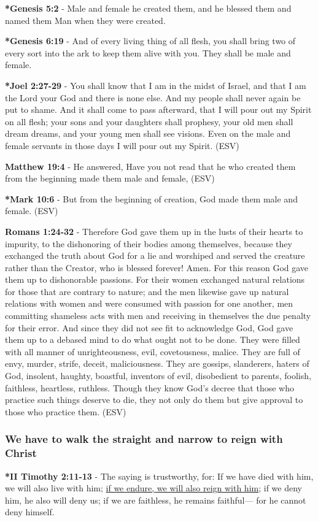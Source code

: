 \documentclass[11pt]{article}
\begin{document}
\textbf{*Genesis 5:2} - Male and female he created them, and he blessed them and named them Man when they were created.

\textbf{*Genesis 6:19} - And of every living thing of all flesh, you shall bring two of every sort into the ark to keep them alive with you. They shall be male and female.

\textbf{*Joel 2:27-29} - You shall know that I am in the midst of Israel, and that I am the Lord your God and there is none else. And my people shall never again be put to shame. And it shall come to pass afterward, that I will pour out my Spirit on all flesh; your sons and your daughters shall prophesy, your old men shall dream dreams, and your young men shall see visions. Even on the male and female servants in those days I will pour out my Spirit. (ESV)

\textbf{Matthew 19:4} - He answered, Have you not read that he who created them from the beginning made them male and female, (ESV)

\textbf{*Mark 10:6} - But from the beginning of creation, God made them male and female. (ESV)

\textbf{Romans 1:24-32} - Therefore God gave them up in the lusts of their hearts to impurity, to the dishonoring of their bodies among themselves, because they exchanged the truth about God for a lie and worshiped and served the creature rather than the Creator, who is blessed forever! Amen. For this reason God gave them up to dishonorable passions. For their women exchanged natural relations for those that are contrary to nature; and the men likewise gave up natural relations with women and were consumed with passion for one another, men committing shameless acts with men and receiving in themselves the due penalty for their error. And since they did not see fit to acknowledge God, God gave them up to a debased mind to do what ought not to be done. They were filled with all manner of unrighteousness, evil, covetousness, malice. They are full of envy, murder, strife, deceit, maliciousness. They are gossips, slanderers, haters of God, insolent, haughty, boastful, inventors of evil, disobedient to parents, foolish, faithless, heartless, ruthless. Though they know God's decree that those who practice such things deserve to die, they not only do them but give approval to those who practice them. (ESV)

\subsubsection{We have to walk the straight and narrow to reign with Christ}
\label{sec:orga8c9648}
\textbf{*II Timothy 2:11-13} - The saying is trustworthy, for: If we have died with him, we will also live with him; \uline{if we endure, we will also reign with him}; if we deny him, he also will deny us; if we are faithless, he remains faithful— for he cannot deny himself.
\end{document}
